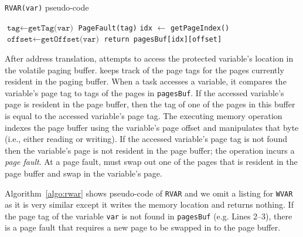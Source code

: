 
\begin{algorithm}[t]
	\caption{\texttt{RVAR(var)} pseudo-code}
	\label{algo:rwar}
	\scriptsize
	\begin{algorithmic}[1]
		\State $\texttt{tag}\leftarrow \texttt{getTag(var)}$ 
			
		\State	\texttt{PageFault(tag)} 
		\Else 
		\State \texttt{idx} $\leftarrow$ \texttt{getPageIndex()} 
		\EndIf
				\State $\texttt{offset}\leftarrow \texttt{getOffset(var)}$ 		
		\State \texttt{return pagesBuf[idx][offset]}  
	\end{algorithmic}
\end{algorithm}

After address translation, \sys attempts to access the protected variable's location in the volatile paging buffer. \sys keeps track of the page tags for the pages currently resident in the paging buffer. When a task accesses a variable, it compares the variable's page tag to tags of the pages in {\tt pagesBuf}.  If the accessed variable's page is resident in the page buffer, then the tag of one of the pages in this buffer is equal to the accessed variable's page tag. The executing memory operation indexes the page buffer using the variable's page offset and manipulates that byte (i.e., either reading or writing). If the accessed variable's page tag is not found then the variable's page is not resident in the page buffer; the operation incurs a {\em page fault}. At a page fault, \sys must swap out one of the pages that is resident in the page buffer and swap in the variable's page.

Algorithm~\ref{algo:rwar} shows pseudo-code of \texttt{RVAR} and we omit a listing for {\tt WVAR} as it is very similar except it writes the memory location and returns nothing. If the page tag of the variable \texttt{var} is not found in \texttt{pagesBuf} (e.g. Lines 2--3), there is a page fault that requires a new page to be swapped in to the page buffer.

